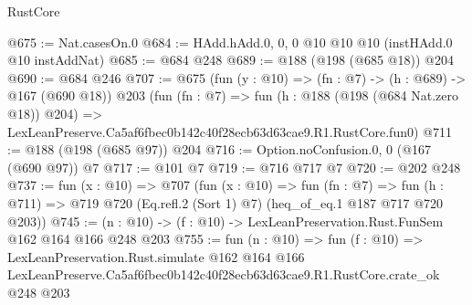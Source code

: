 \begin{lexlean}{RustCore}
\begin{coremodule}
@675 := Nat.casesOn.{0}
@684 := HAdd.hAdd.{0, 0, 0} @10 @10 @10 (instHAdd.{0} @10 instAddNat)
@685 := @684 @248
@689 := @188 (@198 (@685 @18)) @204
@690 := @684 @246
@707 := @675
    (fun (y : @10) => (fn : @7) -> (h : @689) -> @167 (@690 @18))
    @203
    (fun (fn : @7) =>
    fun (h : @188 (@198 (@684 Nat.zero @18)) @204) =>
    LexLeanPreserve.Ca5af6fbec0b142c40f28ecb63d63cae9.R1.RustCore.fun0)
@711 := @188 (@198 (@685 @97)) @204
@716 := Option.noConfusion.{0, 0} (@167 (@690 @97)) @7
@717 := @101 @7
@719 := @716 @717 @7
@720 := @202 @248
@737 := fun (x : @10) =>
  @707
    (fun (x : @10) =>
    fun (fn : @7) =>
    fun (h : @711) => @719 @720 (Eq.refl.{2} (Sort 1) @7) (heq_of_eq.{1} @187 @717 @720 @203))
@745 := (n : @10) -> (f : @10) -> LexLeanPreservation.Rust.FunSem @162 @164 @166 @248 @203
@755 := fun (n : @10) =>
  fun (f : @10) =>
  LexLeanPreservation.Rust.simulate
    @162
    @164
    @166
    LexLeanPreserve.Ca5af6fbec0b142c40f28ecb63d63cae9.R1.RustCore.crate_ok
    @248
    @203
\end{coremodule}
\end{lexlean}
